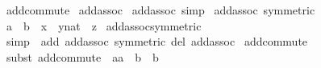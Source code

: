 \begin{isabellebody}
\isamarkupfalse%
\ add{\isachardot}{\kern0pt}commute\isanewline
{}\isamarkupfalse%
\ add{\isachardot}{\kern0pt}assoc\isanewline
{}\isamarkupfalse%
\ add{\isachardot}{\kern0pt}assoc\ {\isacharbrackleft}{\kern0pt}simp{\isacharbrackright}{\kern0pt}\isanewline
{}\isamarkupfalse%
\ add{\isachardot}{\kern0pt}assoc\ {\isacharbrackleft}{\kern0pt}symmetric{\isacharbrackright}{\kern0pt}\isanewline
\isanewline
{}\isamarkupfalse%
\ {\isachardoublequoteopen}a\ {\isacharplus}{\kern0pt}\ b\ {\isacharequal}{\kern0pt}\ x\ {\isacharplus}{\kern0pt}\ {\isacharparenleft}{\kern0pt}{\isacharparenleft}{\kern0pt}y{\isacharcolon}{\kern0pt}{\isacharcolon}{\kern0pt}nat{\isacharparenright}{\kern0pt}\ {\isacharplus}{\kern0pt}\ z{\isacharparenright}{\kern0pt}{\isachardoublequoteclose}\isanewline
{}\isamarkupfalse%
\ add{\isachardot}{\kern0pt}assoc{\isacharbrackleft}{\kern0pt}symmetric{\isacharbrackright}{\kern0pt}\isanewline
%
\isadelimproof
\ \ %
\endisadelimproof
%
\isatagproof
{}\isamarkupfalse%
\ {\isacharparenleft}{\kern0pt}simp\ \ add{\isacharcolon}{\kern0pt}\ add{\isachardot}{\kern0pt}assoc\ {\isacharbrackleft}{\kern0pt}symmetric{\isacharbrackright}{\kern0pt}\ del{\isacharcolon}{\kern0pt}\ add{\isachardot}{\kern0pt}assoc{\isacharparenright}{\kern0pt}\isanewline
{}\isamarkupfalse%
\ add{\isachardot}{\kern0pt}commute\isanewline
\ \ \isamarkupfalse%
\ {\isacharparenleft}{\kern0pt}subst\ add{\isachardot}{\kern0pt}commute\ {\isacharbrackleft}{\kern0pt}\ a{\isacharequal}{\kern0pt}a\ \ b\ {\isacharequal}{\kern0pt}\ b{\isacharbrackright}{\kern0pt}{\isacharparenright}{\kern0pt}\isanewline
\ \ \isamarkupfalse%
%
\endisatagproof
{\isafoldproof}%
%
\isadelimproof
\isanewline
%
\endisadelimproof
%
\isadelimtheory
\isanewline
%
\endisadelimtheory
%
\isatagtheory
{}\isamarkupfalse%
%
\endisatagtheory
{\isafoldtheory}%
%
\isadelimtheory
%
\endisadelimtheory
%
\end{isabellebody}%
\endinput
